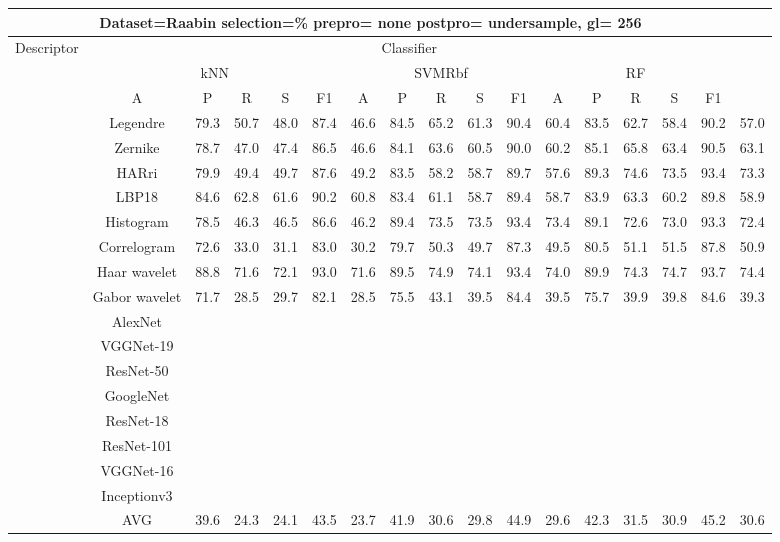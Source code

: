 \documentclass[12pt,italian]{article}
\begin{document}
\begin{tiny}
\begin{longtable}{lcccccccccccccccc}
\toprule
\multicolumn{16}{c}{Dataset=Raabin selection=\% prepro= none postpro= undersample, gl= 256} \\ 
\toprule
Descriptor & \multicolumn{15}{c}{Classifier} \\ 
& \multicolumn{5}{c}{kNN} & \multicolumn{5}{c}{SVMRbf} & \multicolumn{5}{c}{RF} \\ 
& A & P & R & S & F1 & A & P & R & S & F1 & A & P & R & S & F1 \\ 
\midrule
& Legendre & 79.3 & 50.7 & 48.0 & 87.4 & 46.6 & 84.5 & 65.2 & 61.3 & 90.4 & 60.4 & 83.5 & 62.7 & 58.4 & 90.2 & 57.0 \\ 
& Zernike & 78.7 & 47.0 & 47.4 & 86.5 & 46.6 & 84.1 & 63.6 & 60.5 & 90.0 & 60.2 & 85.1 & 65.8 & 63.4 & 90.5 & 63.1 \\ 
& HARri & 79.9 & 49.4 & 49.7 & 87.6 & 49.2 & 83.5 & 58.2 & 58.7 & 89.7 & 57.6 & 89.3 & 74.6 & 73.5 & 93.4 & 73.3 \\ 
& LBP18 & 84.6 & 62.8 & 61.6 & 90.2 & 60.8 & 83.4 & 61.1 & 58.7 & 89.4 & 58.7 & 83.9 & 63.3 & 60.2 & 89.8 & 58.9 \\ 
& Histogram & 78.5 & 46.3 & 46.5 & 86.6 & 46.2 & 89.4 & 73.5 & 73.5 & 93.4 & 73.4 & 89.1 & 72.6 & 73.0 & 93.3 & 72.4 \\ 
& Correlogram & 72.6 & 33.0 & 31.1 & 83.0 & 30.2 & 79.7 & 50.3 & 49.7 & 87.3 & 49.5 & 80.5 & 51.1 & 51.5 & 87.8 & 50.9 \\ 
& Haar wavelet & 88.8 & 71.6 & 72.1 & 93.0 & 71.6 & 89.5 & 74.9 & 74.1 & 93.4 & 74.0 & 89.9 & 74.3 & 74.7 & 93.7 & 74.4 \\ 
& Gabor wavelet & 71.7 & 28.5 & 29.7 & 82.1 & 28.5 & 75.5 & 43.1 & 39.5 & 84.4 & 39.5 & 75.7 & 39.9 & 39.8 & 84.6 & 39.3 \\ 
& AlexNet \\ 
& VGGNet-19 \\ 
& ResNet-50 \\ 
& GoogleNet \\ 
& ResNet-18 \\ 
& ResNet-101 \\ 
& VGGNet-16 \\ 
& Inceptionv3 \\ 
\hline
& AVG & 39.6 & 24.3 & 24.1 & 43.5 & 23.7 & 41.9 & 30.6 & 29.8 & 44.9 & 29.6 & 42.3 & 31.5 & 30.9 & 45.2 & 30.6 \\ 
\hline
\bottomrule
\end{longtable} 


\end{tiny}
\end{document}
